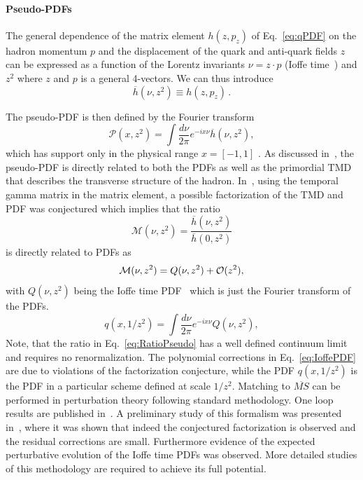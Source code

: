 \paragraph*{Pseudo-PDFs} 
The general dependence of the  matrix element $h(z,p_z)$ of Eq.~\eqref{eq:qPDF} 
on the hadron momentum $p$ and the displacement of the quark and anti-quark 
fields $z$ can be expressed as a function of the Lorentz invariants 
$\nu=z\cdot p$ (Ioffe time~\cite{Ioffe:1969kf,Braun:1994jq}) 
and $z^2$ where $z$  and $p$ is a general 4-vectors.  
%
We can thus introduce
\begin{equation}
\overline{h}(\nu,z^2) \equiv h(z,p_z)\,.
\end{equation}

The pseudo-PDF is then defined by the Fourier transform
%
\begin{equation}
{\mathcal P}(x,z^2)=\int \frac{d\nu}{2\pi} e^{-ix\nu} \overline{h}(\nu,z^2),
\end{equation}
which has support only in the physical range 
$x=[-1,1]$ \cite{Radyushkin:2016hsy,Radyushkin:2017cyf}. 
%
As discussed in~\cite{Radyushkin:2016hsy,Radyushkin:2017cyf}, the pseudo-PDF 
is directly related to both the PDFs as well as the primordial TMD that 
describes the transverse structure of the hadron.
%
In~\cite{Radyushkin:2017cyf}, using the temporal gamma matrix in the matrix 
element, a possible factorization of the TMD and PDF was conjectured which 
implies that the ratio
%
\begin{equation}
{\mathcal M}(\nu,z^2) =\frac{\overline h(\nu,z^2)}{\overline h(0,z^2)}
\label{eq:RatioPseudo}
\end{equation}
is directly related to PDFs as 
\begin{equation}
{\mathcal M}(\nu,z^2) =Q(\nu,z^2) + {\cal O}(z^2),
\label{eq:IoffePDF}
\end{equation}
with $Q(\nu,z^2)$ being the Ioffe time PDF~\cite{Ioffe:1969kf,Braun:1994jq} 
which is just the Fourier transform of the PDFs.
\begin{equation}
{q}(x,1/z^2)=\int \frac{d\nu}{2\pi} e^{-ix\nu} Q(\nu,z^2),
\end{equation}
Note, that the ratio in Eq.~\ref{eq:RatioPseudo} has a well defined continuum 
limit and requires no renormalization. 
%
The polynomial corrections in Eq.~\ref{eq:IoffePDF} are due to violations of 
the factorization conjecture, while the PDF ${q}(x,1/z^2)$ is the PDF in a 
particular scheme defined at scale $1/z^2$. Matching to $\overline{MS}$ 
can be performed in perturbation theory following standard methodology. 
%
One loop results are published in~\cite{Ji:2017rah}.
%
A preliminary study of this formalism was presented in~\cite{Orginos:2017kos}, 
where it was shown that indeed the conjectured factorization is observed and 
the residual corrections are small. Furthermore  evidence of the expected 
perturbative evolution of the Ioffe time PDFs was observed. 
%
More detailed studies of this methodology are required to achieve its full 
potential.  
